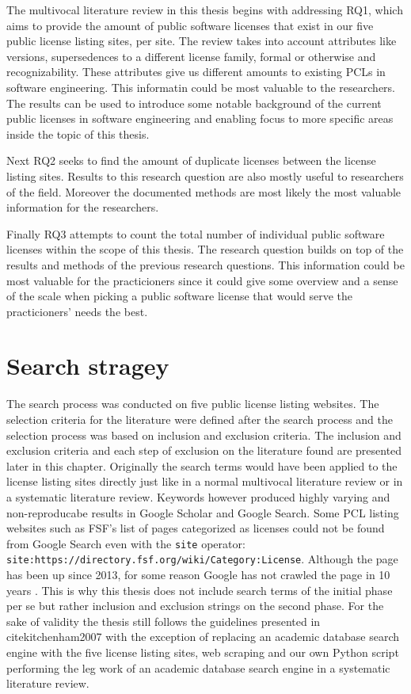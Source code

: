 The multivocal literature review in this thesis begins with addressing RQ1, which aims to provide the amount of public software licenses that exist in our five public license listing sites, per site. The review takes into account attributes like versions, supersedences to a different license family, formal or otherwise and recognizability. These attributes give us different amounts to existing PCLs in software engineering. This informatin could be most valuable to the researchers. The results can be used to introduce some notable background of the current public licenses in software engineering and enabling focus to more specific areas inside the topic of this thesis.

Next RQ2 seeks to find the amount of duplicate licenses between the license listing sites. Results to this research question are also mostly useful to researchers of the field. Moreover the documented methods are most likely the most valuable information for the researchers.

Finally RQ3 attempts to count the total number of individual public software licenses within the scope of this thesis. The research question builds on top of the results and methods of the previous research questions. This information could be most valuable for the practicioners since it could give some overview and a sense of the scale when picking a public software license that would serve the practicioners' needs the best.

\section{Search stragey}
The search process was conducted on five public license listing websites. The selection criteria for the literature were defined after the search process and the selection process was based on inclusion and exclusion criteria. The inclusion and exclusion criteria and each step of exclusion on the literature found are presented later in this chapter. Originally the search terms would have been applied to the license listing sites directly just like in a normal multivocal literature review or in a systematic literature review. Keywords however produced highly varying and non-reproducabe results in Google Scholar and Google Search. Some PCL listing websites such as FSF's list of pages categorized as licenses could not be found from Google Search even with the \texttt{site} operator: \\
\texttt{site:https://directory.fsf.org/wiki/Category:License}. Although the page has been up since 2013, for some reason Google has not crawled the page in 10 years \citep{fsf:licenselist}. This is why this thesis does not include search terms of the initial phase per se but rather inclusion and exclusion strings on the second phase. For the sake of validity the thesis still follows the guidelines presented in cite{kitchenham2007} with the exception of replacing an academic database search engine with the five license listing sites, web scraping and our own Python script performing the leg work of an academic database search engine in a systematic literature review.

